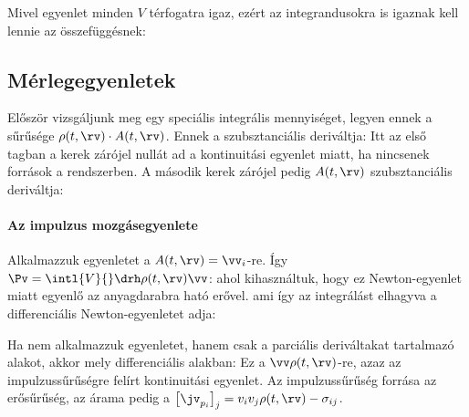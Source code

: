     Mivel  egyenlet minden $V$ térfogatra igaz, ezért az integrandusokra is igaznak kell lennie az összefüggésnek:
   
  \subsection{Mérlegegyenletek}
   
   Először vizsgáljunk meg egy speciális integrális mennyiséget, legyen ennek a sűrűsége $\rho(t,\rv)\cdot A(t,\rv)$.
   Ennek a szubsztanciális deriváltja:
   Itt az első tagban a kerek zárójel nullát ad a kontinuitási egyenlet miatt, ha nincsenek források a rendszerben.
   A második kerek zárójel pedig $A(t,\rv)$ szubsztanciális deriváltja:
   
   \paragraph{Az impulzus mozgásegyenlete}
    
    Alkalmazzuk  egyenletet a $A(t,\rv)=\vv_i$-re. Így $\Pv=\intl{V}{}\drh\rho(t,\rv)\vv$:
    ahol kihasználtuk, hogy ez Newton-egyenlet miatt egyenlő az anyagdarabra ható erővel. ami így az integrálást elhagyva a differenciális Newton-egyenletet adja:
    
    Ha nem alkalmazzuk  egyenletet, hanem csak a parciális deriváltakat tartalmazó alakot, akkor 
    mely differenciális alakban:
    Ez a $\vv\rho(t,\rv)$-re, azaz az impulzussűrűségre felírt kontinuitási egyenlet.
   Az impulzussűrűség forrása az erősűrűség, az árama pedig a $\big[\jv_{p_i}\big]_j=v_iv_j \rho(t,\rv)-\sigma_{ij}$.
    
